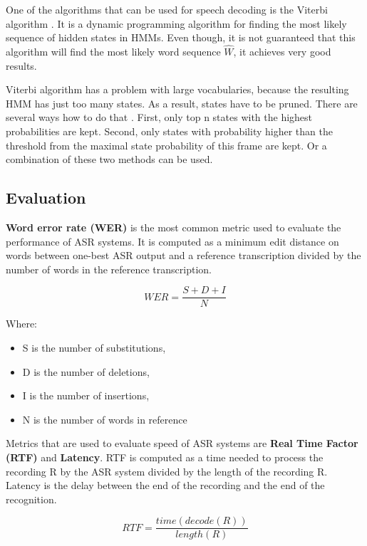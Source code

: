 One of the algorithms that can be used for speech decoding is the Viterbi algorithm \cite{forney1973viterbi}.
It is a dynamic programming algorithm for finding the most likely sequence of hidden states in HMMs.
Even though, it is not guaranteed that this algorithm will find the most likely word sequence $\widehat{W}$,
  it achieves very good results.

Viterbi algorithm has a problem with large vocabularies,
  because the resulting HMM has just too many states.
As a result, states have to be pruned.
There are several ways how to do that \cite{jang2002optimization}.
First, only top n states with the highest probabilities are kept.
Second, only states with probability higher than the threshold from the maximal state probability of this frame are kept.
Or a combination of these two methods can be used.


\subsection{Evaluation}
\textbf{Word error rate (WER)} is the most common metric used to evaluate the performance of ASR systems.
It is computed as a minimum edit distance on words between one-best ASR output and a reference transcription divided by the number of words in the reference transcription.

\begin{equation}
  WER = \frac{S + D + I}{N}
\end{equation}

Where:
\begin{itemize}
  \item S is the number of substitutions,
  \item D is the number of deletions,
  \item I is the number of insertions,
  \item N is the number of words in reference
\end{itemize}

Metrics that are used to evaluate speed of ASR systems are \textbf{Real Time Factor (RTF)} and \textbf{Latency}.
RTF is computed as a time needed to process the recording R by the ASR system divided by the length of the recording R.
Latency is the delay between the end of the recording and the end of the recognition.

\begin{equation}
  RTF = \frac{time(decode(R))}{length(R)}
\end{equation}


